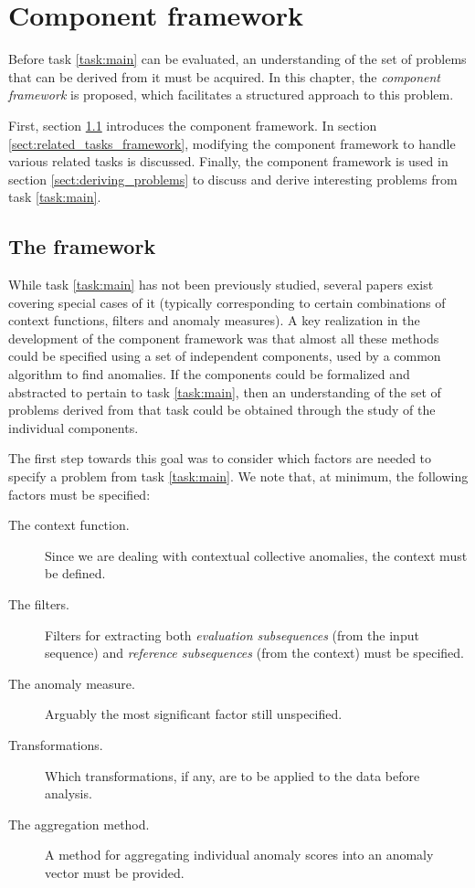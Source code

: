 \chapter{Component framework}
\label{ch:methods}

Before task \ref{task:main} can be evaluated, an understanding of the set of problems that can be derived from it must be acquired. In this chapter, the \emph{component framework} is proposed, which facilitates a structured approach to this problem.

First, section \ref{sect:framework} introduces the component framework. In section \ref{sect:related_tasks_framework}, modifying the component framework to handle various related tasks is discussed. Finally, the component framework is used in section \ref{sect:deriving_problems} to discuss and derive interesting problems from task \ref{task:main}.

\section{The framework}
\label{sect:framework}

While task \ref{task:main} has not been previously studied, several papers exist covering special cases of it (typically corresponding to certain combinations of context functions, filters and anomaly measures). A key realization in the development of the component framework was that almost all these methods could be specified using a set of independent components, used by a common algorithm to find anomalies. If the components could be formalized and abstracted to pertain to task \ref{task:main}, then an understanding of the set of problems derived from that task could be obtained through the study of the individual components.

The first step towards this goal was to consider which factors are needed to specify a problem from task \ref{task:main}. We note that, at minimum, the following factors must be specified:

\begin{description}
  \item[The context function.] Since we are dealing with contextual collective anomalies, the context must be defined.
  \item[The filters.] Filters for extracting both \emph{evaluation subsequences} (from the input sequence) and \emph{reference subsequences} (from the context) must be specified.
  \item[The anomaly measure.] Arguably the most significant factor still unspecified.
  \item[Transformations.] Which transformations, if any, are to be applied to the data before analysis.
  \item[The aggregation method.] A method for aggregating individual anomaly scores into an anomaly vector must be provided.
\end{description}

